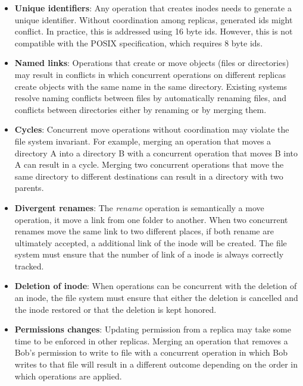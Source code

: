\documentclass[sigconf, 10pt]{acmart}
\begin{document}
\begin{itemize}
	\item \textbf{Unique identifiers}: Any operation that creates
	inodes needs to generate a unique identifier.
	Without coordination among replicas, generated ids might conflict.
	In practice, this is addressed using 16 byte ids.
	However, this is not compatible with the POSIX specification, which requires 8 byte ids.
	\item \textbf{Named links}: Operations that create or move objects (files or directories)
	may result in conflicts in which concurrent operations on different replicas create
	objects with the same name in the same directory.
	Existing systems resolve naming conflicts between files by automatically renaming
  files, and conflicts between directories either by renaming or by merging them.
    \item \textbf{Cycles}: Concurrent move operations without coordination may violate the file system invariant.
    For example, merging an operation that moves a directory A into a
	directory B with a concurrent operation that moves B into A can result in a cycle.
    Merging two concurrent operations that move the same directory to different destinations can result in a directory with two parents.
  \item \textbf{Divergent renames}: The \textit{rename} operation is semantically a move operation, it move a link from one folder to another. When two concurrent renames move the same link to two different places, if both rename are ultimately accepted, a additional link of the inode will be created. The file system must ensure that the number of link of a inode is always correctly tracked.
  \item \textbf{Deletion of inode}: When operations can be concurrent with the deletion of an inode, the file system
  must ensure that either the deletion is cancelled and the inode restored or that the deletion is kept honored.
  \item \textbf{Permissions changes}: Updating permission from a replica may take some time to be enforced in other replicas.
  Merging an operation that removes a Bob's permission to write to file with a concurrent operation in which Bob writes
  to that file will result in a different outcome depending on the order in which operations are applied.
\end{itemize}
\end{document}
